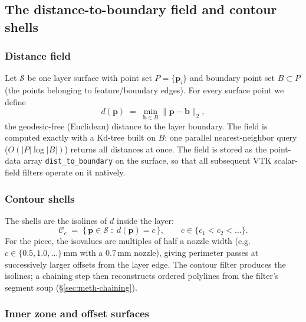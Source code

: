 \subsection{The distance-to-boundary field and contour shells}
\label{sec:meth-shells}

\subsubsection{Distance field}

Let $\mathcal{S}$ be one layer surface with point set
$P = \{\mathbf{p}_i\}$ and boundary point set
$B \subset P$ (the points belonging to feature/boundary edges). For
every surface point we define
\begin{equation}
  d(\mathbf{p}) \;=\; \min_{\mathbf{b} \in B} \|\mathbf{p} - \mathbf{b}\|_2,
\end{equation}
the geodesic-free (Euclidean) distance to the layer boundary. The field
is computed exactly with a Kd-tree built on $B$: one parallel
nearest-neighbor query ($O(|P| \log |B|)$) returns all distances at
once. The field is stored as the point-data array
\texttt{dist\_to\_boundary} on the surface, so that all subsequent
VTK scalar-field filters operate on it natively.

\subsubsection{Contour shells}

The shells are the isolines of $d$ inside the layer:
\begin{equation}
  \mathcal{C}_c \;=\; \{\,\mathbf{p} \in \mathcal{S} \;:\; d(\mathbf{p}) = c\,\},
  \qquad c \in \{c_1 < c_2 < \dots\}.
\end{equation}
For the piece, the isovalues are multiples of half a nozzle width
(e.g.\ $c \in \{0.5, 1.0, \dots\}$\,mm with a 0.7\,mm nozzle), giving
perimeter passes at successively larger offsets from the layer edge.
The contour filter produces the isolines; a chaining step then
reconstructs ordered polylines from the filter's segment soup
(\S\ref{sec:meth-chaining}).

\subsubsection{Inner zone and offset surfaces}

